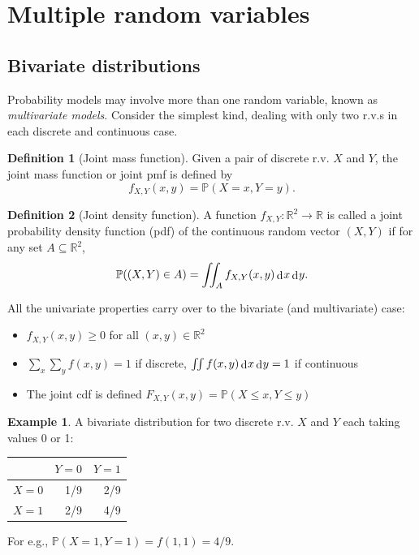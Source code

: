 \documentclass[
]{book}
\providecommand{\tightlist}{%
  \setlength{\itemsep}{0pt}\setlength{\parskip}{0pt}}
\newcommand{\bbR}{\mathbb{R}}
\newcommand{\bbP}{\mathbb{P}}
\DeclareMathOperator{\dd}{d}
\newcommand{\dint}{\dd\hspace{0.5pt}\!}
\theoremstyle{definition}
\newtheorem{definition}{Definition}[chapter]
\theoremstyle{definition}
\newtheorem{example}{Example}[chapter]
\theoremstyle{definition}
\theoremstyle{definition}
\theoremstyle{remark}
\begin{document}
\hypertarget{multiple-random-variables}{%
\section{Multiple random variables}\label{multiple-random-variables}}

\hypertarget{bivariate-distributions}{%
\subsection{Bivariate distributions}\label{bivariate-distributions}}

Probability models may involve more than one random variable, known as \emph{multivariate models}.
Consider the simplest kind, dealing with only two r.v.s in each discrete and continuous case.

\begin{definition}[Joint mass function]
Given a pair of discrete r.v. \(X\) and \(Y\), the joint mass function or joint pmf is defined by
\[
f_{X,Y}(x,y) = \bbP(X=x,Y=y).
\]
\end{definition}

\begin{definition}[Joint density function]
A function \(f_{X,Y}:\bbR^2\to\bbR\) is called a joint probability density function (pdf) of the continuous random vector \((X,Y)\) if for any set \(A\subseteq\bbR^2\),
\[
  \bbP((X,Y) \in A) = \iint_{A} f_{X,Y}(x,y)\dint x \dint y.
\]
\end{definition}

All the univariate properties carry over to the bivariate (and multivariate) case:

\begin{itemize}
\tightlist
\item
  \(f_{X,Y}(x,y) \geq 0\) for all \((x,y) \in \bbR^2\)
\item
  \(\sum_x\sum_y f(x,y) = 1\) if discrete, \(\iint f(x,y)\dint x \dint y = 1\) if continuous
\item
  The joint cdf is defined \(F_{X,Y}(x,y) = \bbP(X\leq x, Y\leq y)\)
\end{itemize}

\begin{example}
A bivariate distribution for two discrete r.v. \(X\) and \(Y\) each taking values 0 or 1:

\begin{longtable}[]{@{}lrr@{}}
\toprule
& \(Y=0\) & \(Y=1\) \\
\midrule
\endhead
\(X=0\) & 1/9 & 2/9 \\
\(X=1\) & 2/9 & 4/9 \\
\bottomrule
\end{longtable}

For e.g., \(\bbP(X=1,Y=1) = f(1,1) = 4/9\).
\end{example}
\end{document}
